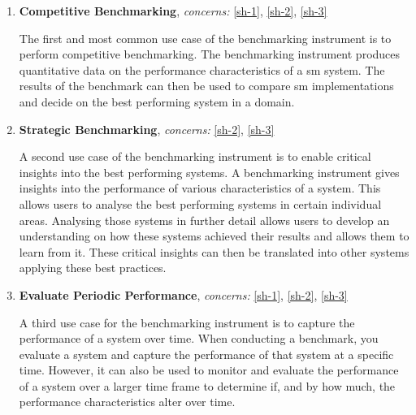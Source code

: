\begin{enumerate}[label=\textbf{UC\arabic*}, leftmargin=3\parindent]
    \item \textbf{Competitive Benchmarking}, \textit{concerns:} \ref{sh-1}, \ref{sh-2}, \ref{sh-3}
    \label{u-1}
    
    The first and most common use case of the benchmarking instrument is to perform competitive benchmarking. The benchmarking instrument produces quantitative data on the performance characteristics of a \gls{sm} system.  The results of the benchmark can then be used to compare \gls{sm} implementations and decide on the best performing system in a domain.
    
    \item \textbf{Strategic Benchmarking}, \textit{concerns:} \ref{sh-2}, \ref{sh-3}
    \label{u-2}
    
    
    A second use case of the benchmarking instrument is to enable critical insights into the best performing systems. A benchmarking instrument gives insights into the performance of various characteristics of a system. This allows users to analyse the best performing systems in certain individual areas. Analysing those systems in further detail allows users to develop an understanding on how these systems achieved their results and allows them to learn from it. These critical insights can then be translated into other systems applying these best practices.
    
    \item \textbf{Evaluate Periodic Performance}, \textit{concerns:} \ref{sh-1}, \ref{sh-2}, \ref{sh-3}
    \label{u-3}
    
    A third use case for the benchmarking instrument is to capture the performance of a system over time. When conducting a benchmark, you evaluate a system and capture the performance of that system at a specific time. However, it can also be used to monitor and evaluate the performance of a system over a larger time frame to determine if, and by how much, the performance characteristics alter over time.
    

\end{enumerate}
